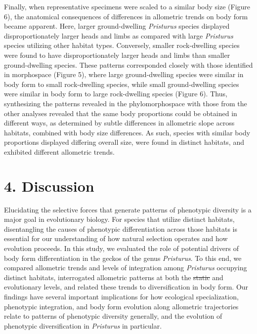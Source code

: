 \documentclass[
  11pt,
]{article}
\providecommand{\DIFaddtex}[1]{{\protect\color{blue}\uwave{#1}}} %
\providecommand{\DIFdeltex}[1]{{\protect\color{red}\sout{#1}}}                      %
\providecommand{\DIFaddbegin}{} %
\providecommand{\DIFaddend}{} %
\providecommand{\DIFdelbegin}{} %
\providecommand{\DIFdelend}{} %
\providecommand{\DIFadd}[1]{\texorpdfstring{\DIFaddtex{#1}}{#1}} %
\providecommand{\DIFdel}[1]{\texorpdfstring{\DIFdeltex{#1}}{}} %
\newcommand{\DIFscaledelfig}{0.5}
\newlength{\DIFdelgraphicswidth} %
\newlength{\DIFdelgraphicsheight} %
\newcommand{\DIFaddincludegraphics}[2][]{{\color{blue}\fbox{\DIFOincludegraphics[#1]{#2}}}} %
\newcommand{\DIFdelincludegraphics}[2][]{%
\sbox{\DIFdelgraphicsbox}{\DIFOincludegraphics[#1]{#2}}%
\settoboxwidth{\DIFdelgraphicswidth}{\DIFdelgraphicsbox} %
\settoboxtotalheight{\DIFdelgraphicsheight}{\DIFdelgraphicsbox} %
\scalebox{\DIFscaledelfig}{%
\parbox[b]{\DIFdelgraphicswidth}{\usebox{\DIFdelgraphicsbox}\\[-\baselineskip] \rule{\DIFdelgraphicswidth}{0em}}\llap{\resizebox{\DIFdelgraphicswidth}{\DIFdelgraphicsheight}{%
\setlength{\unitlength}{\DIFdelgraphicswidth}%
\begin{picture}(1,1)%
\thicklines\linethickness{2pt} %
{\color[rgb]{1,0,0}\put(0,0){\framebox(1,1){}}}%
{\color[rgb]{1,0,0}\put(0,0){\line( 1,1){1}}}%
{\color[rgb]{1,0,0}\put(0,1){\line(1,-1){1}}}%
\end{picture}%
}\hspace*{3pt}}} %
} %
\DeclareRobustCommand{\DIFaddbegin}{\DIFOaddbegin \let\includegraphics\DIFaddincludegraphics} %
\DeclareRobustCommand{\DIFaddend}{\DIFOaddend \let\includegraphics\DIFOincludegraphics} %
\DeclareRobustCommand{\DIFdelbegin}{\DIFOdelbegin \let\includegraphics\DIFdelincludegraphics} %
\DeclareRobustCommand{\DIFdelend}{\DIFOaddend \let\includegraphics\DIFOincludegraphics} %
\begin{document}
Finally, when representative specimens were scaled to a similar body
size (Figure 6), the anatomical consequences of differences in
allometric trends on body form became apparent. Here, larger
ground-dwelling \emph{Pristurus} species displayed disproportionately
larger heads and limbs as compared with large \emph{Pristurus} species
utilizing other habitat types. Conversely, smaller rock-dwelling species
were found to have disproportionately larger heads and limbs than
smaller ground-dwelling species. These patterns corresponded closely
with those identified in morphospace (Figure 5), where large
ground-dwelling species were similar in body form to small rock-dwelling
species, while small ground-dwelling species were similar in body form
to large rock-dwelling species (Figure 6). Thus, synthesizing the
patterns revealed in the phylomorphospace with those from the other
analyses revealed that the same body proportions could be obtained in
different ways, as determined by subtle differences in allometric slope
across habitats, combined with body size differences. As such, species
with similar body proportions displayed differing overall size, were
found in distinct habitats, and exhibited different allometric trends.
\hfill\break

\hypertarget{discussion}{%
\section{4. Discussion}\label{discussion}}

Elucidating the selective forces that generate patterns of phenotypic
diversity is a major goal in evolutionary biology. For species that
utilize distinct habitats, disentangling the causes of phenotypic
differentiation across those habitats is essential for our understanding
of how natural selection operates and how evolution proceeds. In this
study, we evaluated the role of potential drivers of body form
differentiation in the geckos of the genus \emph{Pristurus}. To this
end, we compared allometric trends and levels of integration among
\emph{Pristurus} occupying distinct habitats, interrogated allometric
patterns at both the \DIFdelbegin \DIFdel{static }\DIFdelend \DIFaddbegin \DIFadd{intraspecific }\DIFaddend and evolutionary levels, and related
these trends to diversification in body form. Our findings have several
important implications for how ecological specialization, phenotypic
integration, and body form evolution along allometric trajectories
relate to patterns of phenotypic diversity generally, and the evolution
of phenotypic diversification in \emph{Pristurus} in particular.
\hfill\break
\end{document}
